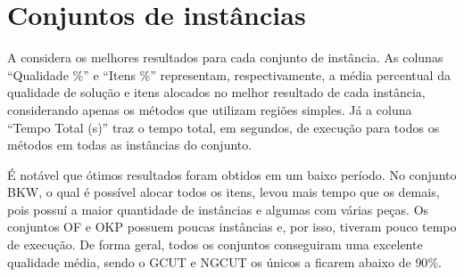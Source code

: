 \section{Conjuntos de instâncias}\label{sec:conjuntos-de-instancias}

A  considera os melhores resultados para cada conjunto de instância.
As colunas “Qualidade \%” e “Itens \%” representam, respectivamente, a média percentual da qualidade
de solução e itens alocados no melhor resultado de cada instância, considerando apenas os
métodos que utilizam regiões simples.
Já a coluna “Tempo Total (s)” traz o tempo total, em segundos, de execução para todos os métodos
em todas as instâncias do conjunto.



É notável que ótimos resultados foram obtidos em um baixo período.
No conjunto BKW, o qual é possível alocar todos os itens, levou mais tempo que os demais, pois
possuí a maior quantidade de instâncias e algumas com várias peças.
Os conjuntos OF e OKP possuem poucas instâncias e, por isso, tiveram pouco tempo de execução.
De forma geral, todos os conjuntos conseguiram uma excelente qualidade média, sendo o GCUT e NGCUT
os únicos a ficarem abaixo de $90\%$.

